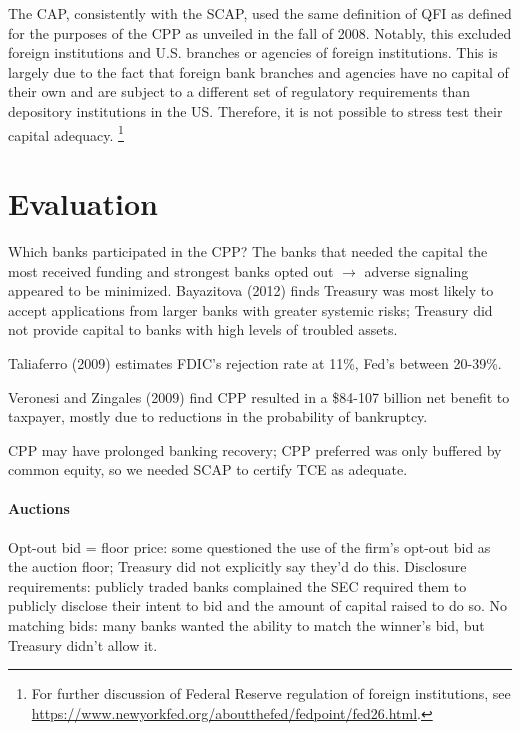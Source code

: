 \documentclass[12pt]{article}
\begin{document}
The CAP, consistently with the SCAP, used the same definition of QFI as defined for the purposes of the CPP as unveiled in the fall of 2008. Notably, this excluded foreign institutions and U.S. branches or agencies of foreign institutions. This is largely due to the fact that foreign bank branches and agencies have no capital of their own and are subject to a different set of regulatory requirements than depository institutions in the US. Therefore, it is not possible to stress test their capital adequacy. \footnote{For further discussion of Federal Reserve regulation of foreign institutions, see \url{https://www.newyorkfed.org/aboutthefed/fedpoint/fed26.html}.}

\section{Evaluation}

Which banks participated in the CPP? The banks that needed the capital the most received funding and strongest banks opted out $\rightarrow$ adverse signaling appeared to be minimized. Bayazitova (2012) finds Treasury was most likely to accept applications from larger banks with greater systemic risks; Treasury did not provide capital to banks with high levels of troubled assets. 

Taliaferro (2009) estimates FDIC's rejection rate at 11\%, Fed's between 20-39\%.

Veronesi and Zingales (2009) find CPP resulted in a \$84-107 billion net benefit to taxpayer, mostly due to reductions in the probability of bankruptcy. 

CPP may have prolonged banking recovery; CPP preferred was only buffered by common equity, so we needed SCAP to certify TCE as adequate. 

\paragraph{Auctions}

Opt-out bid = floor price:  some questioned the use of the firm's opt-out bid as the auction floor; Treasury did not explicitly say they'd do this. 
Disclosure requirements: publicly traded banks complained the SEC required them to publicly disclose their intent to bid and the amount of capital raised to do so.
No matching bids: many banks wanted the ability to match the winner's bid, but Treasury didn't allow it.



\end{document}
